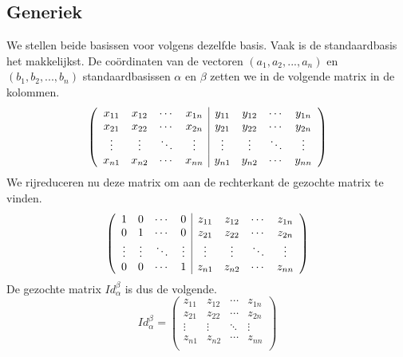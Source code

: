 \documentclass[lineaire_algebra_oplossingen.tex]{subfiles}
\begin{document}
\subsection*{Generiek}
We stellen beide basissen voor volgens dezelfde basis. Vaak is de standaardbasis het makkelijkst. %
De co\"ordinaten van de vectoren $(a_1,a_2,...,a_n)$ en $(b_1,b_2,...,b_n)$ standaardbasissen $\alpha$ en $\beta$ zetten we in de volgende matrix in de kolommen.
\[
\left(
\begin{array}{c c c c | c c c c}
x_{11} & x_{12} & \cdots & x_{1n} & y_{11} & y_{12} & \cdots & y_{1n}\\
x_{21} & x_{22} & \cdots & x_{2n} & y_{21} & y_{22} & \cdots & y_{2n}\\
\vdots & \vdots & \ddots & \vdots & \vdots & \vdots & \ddots & \vdots\\
x_{n1} & x_{n2} & \cdots & x_{nn} & y_{n1} & y_{n2} & \cdots & y_{nn}\\
\end{array}
\right)
\]
We rijreduceren nu deze matrix om aan de rechterkant de gezochte matrix te vinden.
\[
\left(
\begin{array}{c c c c | c c c c}
1 & 0 & \cdots & 0 & z_{11} & z_{12} & \cdots & z_{1n}\\
0 & 1 & \cdots & 0 & z_{21} & z_{22} & \cdots & z_{2n}\\
\vdots & \vdots & \ddots & \vdots & \vdots & \vdots & \ddots & \vdots\\
0 & 0 & \cdots & 1 & z_{n1} & z_{n2} & \cdots & z_{nn}\\
\end{array}
\right)
\]
De gezochte matrix $Id_\alpha^\beta$ is dus de volgende.
\[
Id_\alpha^\beta
=
\begin{pmatrix}
z_{11} & z_{12} & \cdots & z_{1n}\\
z_{21} & z_{22} & \cdots & z_{2n}\\
\vdots & \vdots & \ddots & \vdots\\
z_{n1} & z_{n2} & \cdots & z_{nn}\\
\end{pmatrix}
\]
\end{document}

